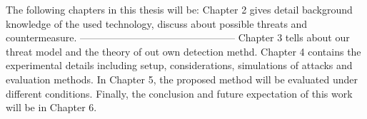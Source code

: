 The following chapters in this thesis will be: Chapter 2 gives detail background knowledge of the used technology, discuss about possible threats and countermeasure.
-----------------------------------------------
Chapter 3 tells about our threat model and the theory of out own detection methd. Chapter 4 contains the experimental details including setup, considerations, simulations of attacks and evaluation methods. In Chapter 5, the proposed method will be evaluated under different conditions. Finally, the conclusion and future expectation of this work will be in Chapter 6.